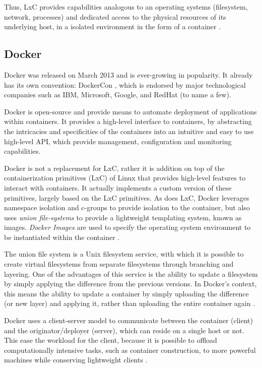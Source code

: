 \documentclass[12pt, titlepage]{uo_temp}
\begin{document}
     Thus, LxC provides capabilities analogous to an operating systems (filesystem, network,
     processes) and dedicated access to the physical resources of its underlying host, in a
     isolated environment in the form of a container \cite{dell}.

     \subsection{Docker}\label{bkg_docker}
     Docker was released on March 2013 and is ever-growing in popularity. It already has
     its own convention: DockerCon \cite{dockercon}, which is endorsed by major
     technological companies such as IBM, Microsoft, Google, and RedHat (to name a few).

     Docker is open-source and provide means to automate deployment of applications within
     containers. It provides a high-level interface to containers, by abstracting the
     intricacies and specificities of the containers into an intuitive and easy to use
     high-level API, which provide management, configuration and monitoring capabilities.
     
     Docker is not a replacement for LxC, rather it is addition on top of the
     containerization primitives (LxC) of Linux that provides high-level features to
     interact with containers. It actually implements a custom version of these
     primitives, largely based on the LxC primitives. As does LxC, Docker leverages
     namespace isolation and c-groups to provide isolation to the container, but also uses
     \emph{union file-systems} to provide a lightweight templating system, known as
     images. \emph{Docker Images} are used to specify the operating system environment to
     be instantiated within the container \cite{docker}.

     The union file system is a Unix filesystem service, with which it is possible to
     create virtual filesystems from separate filesystems through branching and
     layering. One of the advantages of this service is the ability to update a filesystem
     by simply applying the difference from the previous versions. In Docker's context,
     this means the ability to update a container by simply uploading the difference (or
     new layer) and applying it, rather than uploading the entire container again \cite{docker}.
     
     Docker uses a client-server model to communicate between the container (client) and
     the originator/deployer (server), which can reside on a single host or not. This ease
     the workload for the client, because it is possible to offload computationally
     intensive tasks, such as container construction, to more powerful machines while
     conserving lightweight clients \cite{docker}.
    
\end{document}
